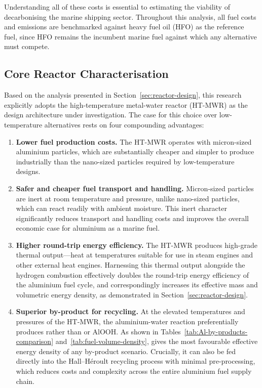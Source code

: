 \documentclass[12pt]{article}
\begin{document}
Understanding all of these costs is essential to estimating the viability of 
decarbonising the marine shipping sector. Throughout this analysis, all fuel 
costs and emissions are benchmarked against heavy fuel oil (HFO) as the 
reference fuel, since HFO remains the incumbent marine fuel against which any 
alternative must compete.

\break

\subsection{Core Reactor Characterisation}
\label{sec:core-reactor-research-questions}

Based on the analysis presented in Section~\ref{sec:reactor-design}, this research 
explicitly adopts the high-temperature metal-water reactor (HT-MWR) as the design 
architecture under investigation. The case for this choice over low-temperature 
alternatives rests on four compounding advantages:

\begin{enumerate}
    \item \textbf{Lower fuel production costs.} The HT-MWR operates with 
    micron-sized aluminium particles, which are substantially cheaper and simpler 
    to produce industrially than the nano-sized particles required by low-temperature 
    designs.

    \item \textbf{Safer and cheaper fuel transport and handling.} Micron-sized 
    particles are inert at room temperature and pressure, unlike nano-sized 
    particles, which can react readily with ambient moisture. This inert character 
    significantly reduces transport and handling costs and improves the overall 
    economic case for aluminium as a marine fuel.

    \item \textbf{Higher round-trip energy efficiency.} The HT-MWR produces 
    high-grade thermal output---heat at temperatures suitable for use in steam 
    engines and other external heat engines. Harnessing this thermal output 
    alongside the hydrogen combustion effectively doubles the round-trip energy 
    efficiency of the aluminium fuel cycle, and correspondingly increases its 
    effective mass and volumetric energy density, as demonstrated in 
    Section~\ref{sec:reactor-design}.

    \item \textbf{Superior by-product for recycling.} At the elevated temperatures 
    and pressures of the HT-MWR, the aluminium-water reaction preferentially 
    produces  rather than  or AlOOH. As shown in 
    Tables~\ref{tab:Al-by-products-comparison} and~\ref{tab:fuel-volume-density},  gives 
    the most favourable effective energy density of any by-product scenario. 
    Crucially, it can also be fed directly into the Hall--H\'{e}roult recycling 
    process with minimal pre-processing, which reduces costs and complexity across 
    the entire aluminium fuel supply chain.
\end{enumerate}
\end{document}
